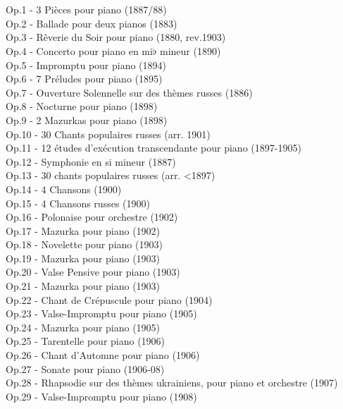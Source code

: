 \\
\\
Op.1 - 3 Pièces pour piano (1887/88)\\
Op.2 - Ballade pour deux pianos (1883)\\
Op.3 - Rêverie du Soir pour piano (1880, rev.1903)\\
Op.4 - Concerto pour piano  en mi$\flat$ mineur (1890)\\
Op.5 - Impromptu pour piano (1894)\\
Op.6 - 7 Préludes pour piano (1895)\\
Op.7 - Ouverture Solennelle sur des thèmes russes (1886)\\
Op.8 - Nocturne pour piano (1898)\\
Op.9 - 2 Mazurkas pour piano (1898)\\
Op.10 - 30 Chants populaires russes (arr. 1901)\\
Op.11 - 12 études d'exécution transcendante pour piano (1897-1905)\\
Op.12 - Symphonie  en si mineur (1887)\\
Op.13 - 30 chants populaires russes (arr. <1897)\\
Op.14 - 4 Chansons (1900)\\
Op.15 - 4 Chansons russes (1900)\\
Op.16 - Polonaise pour orchestre (1902)\\
Op.17 - Mazurka  pour piano (1902)\\
Op.18 - Novelette pour piano (1903)\\
Op.19 - Mazurka  pour piano (1903)\\
Op.20 - Valse Pensive pour piano (1903)\\
Op.21 - Mazurka  pour piano (1903)\\
Op.22 - Chant de Crépuscule pour piano (1904)\\
Op.23 - Valse-Impromptu  pour piano (1905)\\
Op.24 - Mazurka  pour piano (1905)\\
Op.25 - Tarentelle pour piano (1906)\\
Op.26 - Chant d'Automne pour piano (1906)\\
Op.27 - Sonate pour piano (1906-08)\\
Op.28 - Rhapsodie sur des thèmes ukrainiens, pour piano et orchestre (1907)\\
Op.29 - Valse-Impromptu  pour piano (1908)\\
